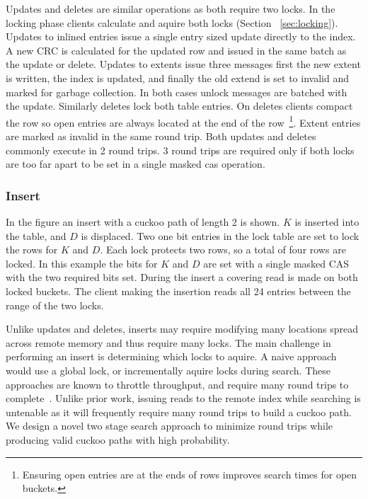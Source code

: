 Updates and deletes are similar operations as both require
two locks. In the locking phase clients calculate and aquire
both locks (Section ~\ref{sec:locking}). Updates to inlined
entries issue a single entry sized update directly to the
index. A new CRC is calculated for the updated row and
issued in the same batch as the update or delete.  Updates
to extents issue three messages first the new extent is
written, the index is updated, and finally the old extend is
set to invalid and marked for garbage collection. In both
cases unlock messages are batched with the update. Similarly
deletes lock both table entries. On deletes clients compact
the row so open entries are always located at the end of the
row~\footnote{Ensuring open entries are at the ends of rows
improves search times for open buckets.}. Extent entries are
marked as invalid in the same round trip. Both updates and
deletes commonly execute in 2 round trips. 3 round trips are
required only if both locks are too far apart to be set in a
single masked cas operation.

\subsubsection{Insert}
\label{sec:insert}


In the figure an insert with a cuckoo path of length
2 is shown. $K$ is inserted into the table, and $D$ is
displaced. Two one bit entries in the lock table are set to
lock the rows for $K$ and $D$. Each lock protects two rows,
so a total of four rows are locked. In this example the bits
for $K$ and $D$ are set with a single masked CAS with the
two required bits set. During the insert a covering read is
made on both locked buckets. The client making the insertion
reads all 24 entries between the range of the two locks.

Unlike updates and deletes, inserts may require modifying
many locations spread across remote memory and thus require
many locks. The main challenge in performing an insert is
determining which locks to aquire. A naive approach would
use a global lock, or incrementally aquire locks during
search. These approaches are known to throttle throughput,
and require many round trips to
complete~\cite{cuckoo-improvements}. Unlike prior work,
issuing reads to the remote index while searching is
untenable as it will frequently require many round trips to
build a cuckoo path.  We design a novel two stage search
approach to minimize round trips while producing valid
cuckoo paths with high probability.

